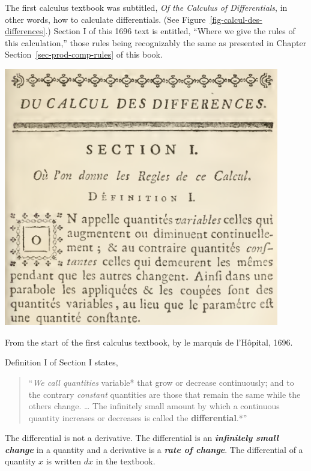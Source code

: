 \documentclass[
  letterpaper,
  DIV=11,
  numbers=noendperiod,
  oneside]{scrreprt}
\begin{document}
The first calculus textbook was subtitled, \emph{Of the Calculus of
Differentials}, in other words, how to calculate differentials. (See
Figure~\ref{fig-calcul-des-differences}.) Section I of this 1696 text is
entitled, ``Where we give the rules of this calculation,'' those rules
being recognizably the same as presented in Chapter
Section~\ref{sec-prod-comp-rules} of this book.

\begin{marginfigure}

{\centering \includegraphics[width=0.9\textwidth,height=\textheight]{Differentiation/www/Hopital-part-1.png}

}

\caption{\label{fig-calcul-des-differences}From the start of the first
calculus textbook, by le marquis de l'Hôpital, 1696.}

\end{marginfigure}

Definition I of Section I states,

\begin{quote}
``\emph{We call quantities }variable* that grow or decrease
continuously; and to the contrary \emph{constant} quantities are those
that remain the same while the others change. \ldots{} The infinitely
small amount by which a continuous quantity increases or decreases is
called the \textbf{differential}.*''
\end{quote}

The differential is not a derivative. The differential is an
\textbf{\emph{infinitely small change}} in a quantity and a derivative
is a \textbf{\emph{rate of change}}. The differential of a quantity
\(x\) is written \(dx\) in the textbook.
\end{document}
